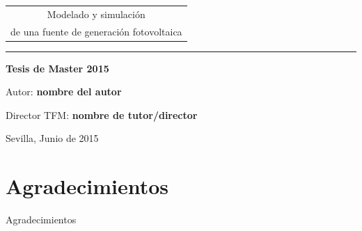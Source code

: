 \documentclass[11pt,a4paper,twoside,titlepage]{book}
\renewcommand{\listtablename}{Índice de tablas}
\renewcommand{\tablename}{Tabla}
\renewcommand{\thepage}{\roman{page}}
\begin{document}
\begin{titlepage}
\begin{center}
{		\begin{tabular}{c}
			\hspace*{-0.22cm} Modelado y simulación \\ de una fuente de generación fotovoltaica    \\

		\end{tabular}}
	
		\vspace*{0.5cm}
		\noindent \rule{\textwidth}{0.5pt}%
		\vspace*{2.0cm}
	
		{\Large\bf Tesis de Master 2015}
	
	
	
		\vspace*{0.3cm}
		{\large Autor:}
		\vspace*{0.5cm}
		{\large\bf nombre del autor} \vspace*{0.5cm}
	
	\vspace*{0.3cm}
		{\large Director TFM:}
		\vspace*{0.5cm}
		{\large\bf  nombre de tutor/director } \vspace*{0.5cm}
		
		\vspace*{2cm} {\large Sevilla, Junio de 2015}
	\end{center}
\end{titlepage}
 
 
 
\chapter*{Agradecimientos}
Agradecimientos


\thispagestyle{empty}

\tableofcontents
\listoftables
\listoffigures


\renewcommand{\listtablename}{Índice de tablas}
\renewcommand{\tablename}{Tabla}


\newpage
\thispagestyle{empty}
\mbox{}


\renewcommand{\thepage}{\arabic{page}}
\setcounter{page}{1}



\end{document}
